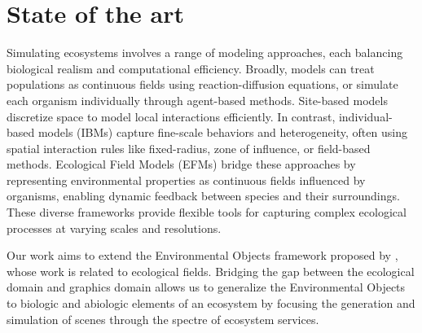 


\section{State of the art}
\label{sec:env-obj_related-works}

Simulating ecosystems involves a range of modeling approaches, each balancing biological realism and computational efficiency. Broadly, models can treat populations as continuous fields using reaction-diffusion equations, or simulate each organism individually through agent-based methods. Site-based models discretize space to model local interactions efficiently. In contrast, individual-based models (IBMs) capture fine-scale behaviors and heterogeneity, often using spatial interaction rules like fixed-radius, zone of influence, or field-based methods. Ecological Field Models (EFMs) bridge these approaches by representing environmental properties as continuous fields influenced by organisms, enabling dynamic feedback between species and their surroundings. These diverse frameworks provide flexible tools for capturing complex ecological processes at varying scales and resolutions.

Our work aims to extend the Environmental Objects framework proposed by \citep{Grosbellet2016}, whose work is related to ecological fields. Bridging the gap between the ecological domain and graphics domain allows us to generalize the Environmental Objects to biologic and abiologic elements of an ecosystem by focusing the generation and simulation of scenes through the spectre of ecosystem services.


